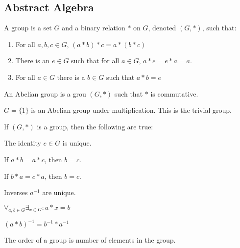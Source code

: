 \documentclass[crop=false,class=article,oneside]{standalone}
\begin{document}
    \subsection{Abstract Algebra}
        \begin{definition}
            A group is a set $G$ and a binary relation $*$
            on $G$, denoted $(G,*)$, such that:
            \begin{enumerate}
                \item For all ${a,b,c}\in{G}$, $(a*b)*c=a*(b*c)$
                \item There is an ${e}\in{G}$ such that for all
                    ${a}\in{G}$, $a*e=e*a=a$.
                \item For all ${a}\in{G}$ there is a ${b}\in{G}$
                    such that $a*b=e$
            \end{enumerate}
        \end{definition}
        \begin{definition}
            An Abelian group is a grou $(G,*)$ such that
            $*$ is commutative.
        \end{definition}
        \begin{example}
            $G=\{1\}$ is an Abelian group
            under multiplication.
            This is the trivial group.
        \end{example}
        \begin{theorem*}
            If $(G,*)$ is a group, then the following are true:
            \begin{enumerate}
                \begin{multicols}{2}
                    \item The identity ${e}\in{G}$ is unique.
                    \item If $a*b=a*c$, then $b=c$.
                    \item If $b*a=c*a$, then $b=c$.
                    \item Inverses $a^{-1}$ are unique.
                    \item $\forall_{{a,b}\in{G}}%
                        \exists_{{x}\in{G}}:a*x=b$
                    \item $(a*b)^{-1}=b^{-1}*a^{-1}$
                \end{multicols}
            \end{enumerate}
        \end{theorem*}
        \begin{definition}
            The order of a group is number of elements in the
            group.
        \end{definition}
\end{document}
